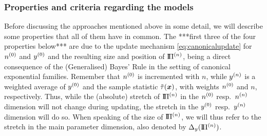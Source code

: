 \subsubsection{Properties and criteria regarding the models}

Before discussing the approaches mentioned above in some detail,
we will describe some properties that all of them have in common.
The ***first three of the four properties below*** are due to the update mechanism \eqref{eq:canonicalupdate}
for $n^{(0)}$ and $y^{(0)}$ and the resulting size and position of $\text{I}\!\Pi^{(n)}$,
being a direct consequence of the (Generalised) Bayes' Rule in the setting of canonical exponential families.
Remember that $n^{(0)}$ is incremented with $n$, while $y^{(n)}$ is a weighted average of $y^{(0)}$ and the sample statistic $\tilde{\tau}({\bm x})$,
with weights $n^{(0)}$ and $n$, respectively.
Thus, while the (absolute) stretch of $\text{I}\!\Pi^{(n)}$ in the $n^{(0)}$ resp.\ $n^{(n)}$ dimension will not change during updating,
the stretch in the $y^{(0)}$ resp.\ $y^{(n)}$ dimension will do so.
When speaking of the size of $\text{I}\!\Pi^{(n)}$, we will thus refer to the stretch in the main parameter dimension, also denoted by $\Delta_y(\text{I}\!\Pi^{(n)})$.
